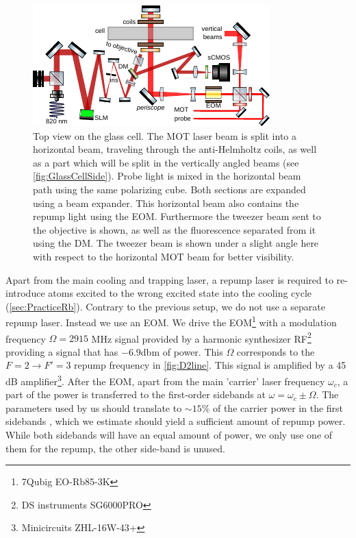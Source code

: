 \begin{figure}[t]
    \centering
    \includegraphics[width=\textwidth]{figures/MOTupview.pdf}
    \caption{
    Top view on the glass cell.
    The MOT laser beam is split into a horizontal beam, traveling through the anti-Helmholtz coils, as well as a part which will be split in the vertically angled beams (see \cref{fig:GlassCellSide}). 
    Probe light is mixed in the horizontal beam path using the same polarizing cube. 
    Both sections are expanded using a beam expander.
    This horizontal beam also contains the repump light using the \ac{EOM}.
    Furthermore the tweezer beam sent to the objective is shown, as well as the fluorescence separated from it using the \acf{DM}.
    The tweezer beam is shown under a slight angle here with respect to the horizontal MOT beam for better visibility. 
    }
    \label{fig:GlassCellTop}
\end{figure}

Apart from the main cooling and trapping laser, a repump laser is required to re-introduce atoms excited to the wrong excited state into the cooling cycle (\cref{sec:PracticeRb}).
Contrary to the previous setup, we do not use a separate repump laser. 
Instead we use an \ac{EOM}.
We drive the EOM\footnote{7Qubig EO-Rb85-3K} with a modulation frequency $\Omega= 2915$ MHz signal provided by a harmonic synthesizer RF\footnote{DS instruments SG6000PRO} providing a signal that has $-6.9$dbm of power.
This $\Omega$ corresponds to the $F=2 \rightarrow F'=3$ repump frequency in \cref{fig:D2line}.
This signal is amplified by a 45 dB amplifier\footnote{Minicircuits ZHL-16W-43+}.
After the EOM, apart from the main 'carrier' laser frequency $\omega_c$, a part of the power is transferred to the first-order sidebands at $\omega = \omega_c \pm 
\Omega$.
The parameters used by us should translate to $\sim 15$\% of the carrier power in the first sidebands \cite{Rens2014}, which we estimate should yield a sufficient amount of repump power. 
While both sidebands will have an equal amount of power, we only use one of them for the repump, the other side-band is unused. 

